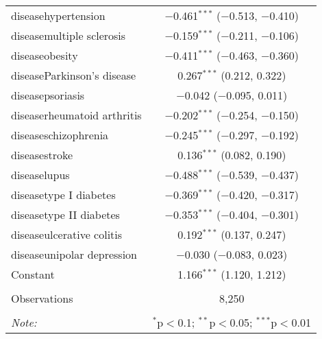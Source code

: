 \begin{table}[!htbp]
\begin{tabular}{@{\extracolsep{5pt}}lc}
  diseasehypertension & $-$0.461$^{***}$ ($-$0.513, $-$0.410) \\ 
  diseasemultiple sclerosis & $-$0.159$^{***}$ ($-$0.211, $-$0.106) \\ 
  diseaseobesity & $-$0.411$^{***}$ ($-$0.463, $-$0.360) \\ 
  diseaseParkinson's disease & 0.267$^{***}$ (0.212, 0.322) \\ 
  diseasepsoriasis & $-$0.042 ($-$0.095, 0.011) \\ 
  diseaserheumatoid arthritis & $-$0.202$^{***}$ ($-$0.254, $-$0.150) \\ 
  diseaseschizophrenia & $-$0.245$^{***}$ ($-$0.297, $-$0.192) \\ 
  diseasestroke & 0.136$^{***}$ (0.082, 0.190) \\ 
  diseaselupus & $-$0.488$^{***}$ ($-$0.539, $-$0.437) \\ 
  diseasetype I diabetes & $-$0.369$^{***}$ ($-$0.420, $-$0.317) \\ 
  diseasetype II diabetes & $-$0.353$^{***}$ ($-$0.404, $-$0.301) \\ 
  diseaseulcerative colitis & 0.192$^{***}$ (0.137, 0.247) \\ 
  diseaseunipolar depression & $-$0.030 ($-$0.083, 0.023) \\ 
  Constant & 1.166$^{***}$ (1.120, 1.212) \\ 
 \hline \\[-1.8ex] 
Observations & 8,250 \\ 
\hline 
\hline \\[-1.8ex] 
\textit{Note:}  & \multicolumn{1}{r}{$^{*}$p$<$0.1; $^{**}$p$<$0.05; $^{***}$p$<$0.01} \\ 
\end{tabular} 
\end{table} 
